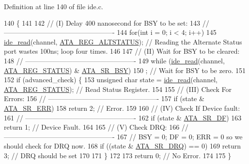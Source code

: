 Definition at line 140 of file ide.\+c.


\begin{DoxyCode}
140                                                                               \{
141     
142     \textcolor{comment}{// (I) Delay 400 nanosecond for BSY to be set:}
143     \textcolor{comment}{// -------------------------------------------------}
144     \textcolor{keywordflow}{for}(\textcolor{keywordtype}{int} i = 0; i < 4; i++)
145         \hyperlink{a00023_aef734da4bdc0c1d014528fd2f66e0686_aef734da4bdc0c1d014528fd2f66e0686}{ide\_read}(channel, \hyperlink{a00023_a051769d4520d201d24bbb06758a5c1de_a051769d4520d201d24bbb06758a5c1de}{ATA\_REG\_ALTSTATUS}); \textcolor{comment}{// Reading the Alternate Status port
       wastes 100ns; loop four times.}
146     
147     \textcolor{comment}{// (II) Wait for BSY to be cleared:}
148     \textcolor{comment}{// -------------------------------------------------}
149     \textcolor{keywordflow}{while} (\hyperlink{a00023_aef734da4bdc0c1d014528fd2f66e0686_aef734da4bdc0c1d014528fd2f66e0686}{ide\_read}(channel, \hyperlink{a00023_a3b532ef33b38be16a240f8f2e21bc5db_a3b532ef33b38be16a240f8f2e21bc5db}{ATA\_REG\_STATUS}) & \hyperlink{a00023_aed1929007f388cab23229c908be5bbaf_aed1929007f388cab23229c908be5bbaf}{ATA\_SR\_BSY})
150         ; \textcolor{comment}{// Wait for BSY to be zero.}
151     
152     \textcolor{keywordflow}{if} (advanced\_check) \{
153         \textcolor{keywordtype}{unsigned} \textcolor{keywordtype}{char} state = \hyperlink{a00023_aef734da4bdc0c1d014528fd2f66e0686_aef734da4bdc0c1d014528fd2f66e0686}{ide\_read}(channel, \hyperlink{a00023_a3b532ef33b38be16a240f8f2e21bc5db_a3b532ef33b38be16a240f8f2e21bc5db}{ATA\_REG\_STATUS}); \textcolor{comment}{// Read Status
       Register.}
154     
155         \textcolor{comment}{// (III) Check For Errors:}
156         \textcolor{comment}{// -------------------------------------------------}
157         \textcolor{keywordflow}{if} (state & \hyperlink{a00023_a8a2cf843df1ae63d4d16748dfe72a592_a8a2cf843df1ae63d4d16748dfe72a592}{ATA\_SR\_ERR})
158             \textcolor{keywordflow}{return} 2; \textcolor{comment}{// Error.}
159     
160         \textcolor{comment}{// (IV) Check If Device fault:}
161         \textcolor{comment}{// -------------------------------------------------}
162         \textcolor{keywordflow}{if} (state & \hyperlink{a00023_aca73201ed93e5c9d9d9fbf51270fde0b_aca73201ed93e5c9d9d9fbf51270fde0b}{ATA\_SR\_DF})
163             \textcolor{keywordflow}{return} 1; \textcolor{comment}{// Device Fault.}
164     
165         \textcolor{comment}{// (V) Check DRQ:}
166         \textcolor{comment}{// -------------------------------------------------}
167         \textcolor{comment}{// BSY = 0; DF = 0; ERR = 0 so we should check for DRQ now.}
168         \textcolor{keywordflow}{if} ((state & \hyperlink{a00023_a27e6aaa78aaaa205a7dadf56b48d0bf6_a27e6aaa78aaaa205a7dadf56b48d0bf6}{ATA\_SR\_DRQ}) == 0)
169             \textcolor{keywordflow}{return} 3; \textcolor{comment}{// DRQ should be set}
170     
171     \}
172     
173     \textcolor{keywordflow}{return} 0; \textcolor{comment}{// No Error.}
174     
175 \}
\end{DoxyCode}
